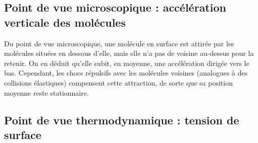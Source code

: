 \subsection{Point de vue microscopique : accélération verticale des molécules}
Du point de vue microscopique, une molécule en surface est attirée par les molécules situées en dessous d’elle, mais elle n’a pas de voisine au-dessus pour la retenir. On en déduit qu’elle subit, en moyenne, une accélération dirigée vers le bas. Cependant, les chocs répulsifs avec les molécules voisines (analogues à des collisions élastiques) compensent cette attraction, de sorte que sa position moyenne reste stationnaire.

\subsection{Point de vue thermodynamique : tension de surface}

